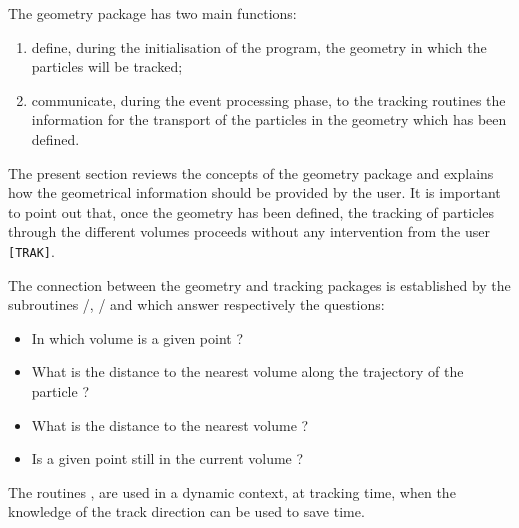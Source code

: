       

The geometry package has two main functions:

\begin{enumerate}
\item define, during the initialisation of the program,
the geometry in which the particles will be tracked;
\item communicate, during the event processing phase, to the tracking 
routines the information for 
the transport of the particles in the geometry which has been defined.
\end{enumerate}

The present section reviews the concepts of the geometry package and explains
how the geometrical information should be provided by the user.
It is important to point out that, once the geometry has been defined,
the tracking of particles through the different volumes proceeds without any
intervention from the user {\tt [TRAK]}. 

The connection between the
geometry and tracking packages is established by the subroutines
/, / and
 which answer respectively the questions:
\begin{itemize}
\item    In which volume is a given point ?
\item    What is the distance to the nearest volume along the trajectory
of the particle ?
\item    What is the distance to the nearest volume ?
\item    Is a given point still in the current volume ?
\end{itemize}
The routines ,  are used in a dynamic context,
at tracking time, when the
knowledge of the track direction can be used to save time.
